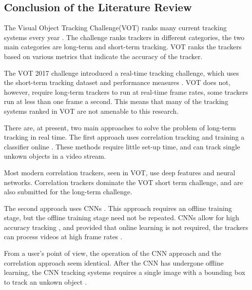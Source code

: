   \subsection{Conclusion of the Literature Review}
    The Visual Object Tracking Challenge(VOT) ranks many current tracking systems every year \cite{VOT2017, Kristan2020a}.
    The challenge ranks trackers in different categories, the two main categories are long-term and short-term tracking.
    VOT ranks the trackers based on various metrics that indicate the accuracy of the tracker. 

    The VOT 2017 challenge introduced a real-time tracking challenge, which uses the short-term tracking dataset and performance measures \cite{Kristan2020a}.
    VOT does not, however, require long-term trackers to run at real-time frame rates, some trackers run at less than one frame a second.
    This means that many of the tracking systems ranked in VOT are not amenable to this research.

    There are, at present, two main approaches to solve the problem of long-term tracking in real time.
    The first approach uses correlation tracking and training a classifier online \cite{Ma2015Correlation, Enriques2014, Kalal2011}.
    These methods require little set-up time, and can track single unkown objects in a video stream.
    
    Most modern correlation trackers, seen in VOT, use deep features and neural networks.
    Correlation trackers dominate the VOT short term challenge, and are also submitted for the long-term challenge.

    The second approach uses CNNs \cite{bertinetto2016}.
    This approach requires an offline training stage, but the offline training stage need not be repeated.
    CNNs allow for high accuracy tracking \cite{CNNTracking, bertinetto2016}, and provided that online learning is not required, the trackers can process videos at high frame rates \cite{Kristan2020a}.

    From a user's point of view, the operation of the CNN approach and the correlation approach seem identical.
    After the CNN has undergone offline learning, the CNN tracking systems requires a single image with a bounding box to track an unkown object \cite{CNNTracking, bertinetto2016}.
